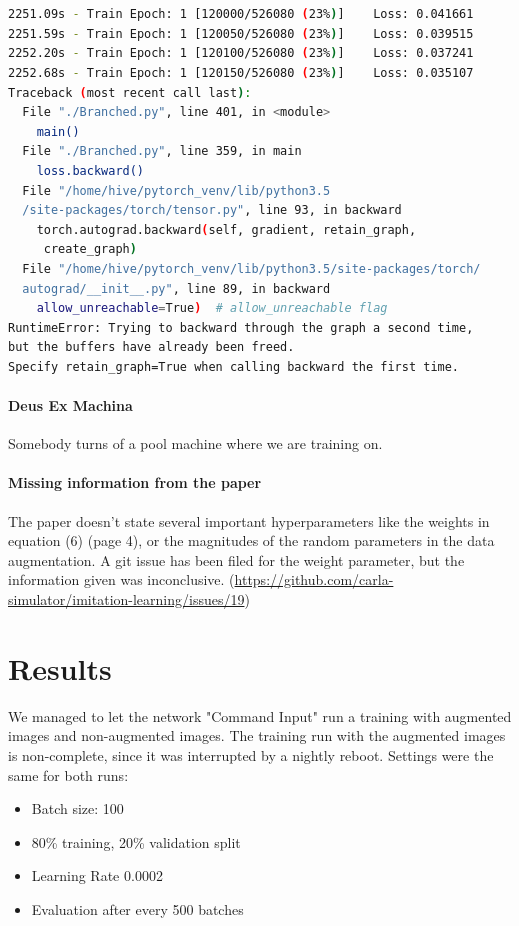 \documentclass[a4paper]{article}
\begin{document}
\begin{lstlisting}[language=bash, caption={Nigthly Reboot Interruption}]


2251.09s - Train Epoch: 1 [120000/526080 (23%)]    Loss: 0.041661
2251.59s - Train Epoch: 1 [120050/526080 (23%)]    Loss: 0.039515
2252.20s - Train Epoch: 1 [120100/526080 (23%)]    Loss: 0.037241
2252.68s - Train Epoch: 1 [120150/526080 (23%)]    Loss: 0.035107
Traceback (most recent call last):
  File "./Branched.py", line 401, in <module>
    main()
  File "./Branched.py", line 359, in main
    loss.backward()
  File "/home/hive/pytorch_venv/lib/python3.5
  /site-packages/torch/tensor.py", line 93, in backward
    torch.autograd.backward(self, gradient, retain_graph,
     create_graph)
  File "/home/hive/pytorch_venv/lib/python3.5/site-packages/torch/
  autograd/__init__.py", line 89, in backward
    allow_unreachable=True)  # allow_unreachable flag
RuntimeError: Trying to backward through the graph a second time, 
but the buffers have already been freed. 
Specify retain_graph=True when calling backward the first time.

\end{lstlisting}

\paragraph{Deus Ex Machina} Somebody turns of a pool machine where we are
training on.

\paragraph{Missing information from the paper} The paper doesn't state several
important hyperparameters like the weights in equation (6) (page 4), or the
magnitudes of the random parameters in the data augmentation. A git issue has
been filed for the weight parameter, but the information given was inconclusive.
(\url{https://github.com/carla-simulator/imitation-learning/issues/19})

\clearpage
\section{Results}
We managed to let the network "Command Input" run a training with augmented images and non-augmented images.
The training run with the augmented images is non-complete, since it was interrupted by a nightly reboot.
Settings were the same for both runs:
\begin{itemize}
	\item Batch size: 100
	\item 80\% training, 20\% validation split
	\item Learning Rate 0.0002
	\item Evaluation after every 500 batches
  \end{itemize}
\end{document}
